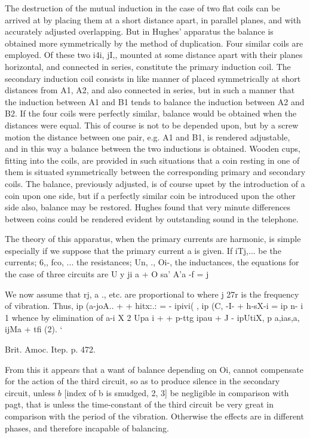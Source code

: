 The destruction of the mutual induction in the case of two flat coils can be
arrived at by placing them at a short distance apart,
in parallel planes, and with accurately adjusted overlapping. But
in Hughes’ apparatus the
balance is obtained more symmetrically by the method of duplication. Four
similar coils are employed.  Of these two i4i, jI,, mounted at some distance
apart with their planes horizontal, and connected in series, constitute the
primary induction coil. The secondary induction coil consists in like manner
of placed symmetrically at short distances from
A1, A2, and also connected in series, but in such a manner that the induction
between A1 and B1 tends to balance the induction between A2 and B2. If the
four coils were perfectly similar, balance would be obtained when the
distances were equal. This of course is not to be depended upon, but by a
screw motion the distance between one pair, e.g. A1 and B1, is rendered
adjustable, and in this way a balance between the two inductions is obtained.
Wooden cups, fitting into the coils, are provided in such situations that a
coin resting in one of them is situated symmetrically between the
corresponding primary and secondary coils. The balance, previously adjusted, is
of course upset by the introduction of a coin upon one side, but if a perfectly
similar coin be introduced upon the other side also, balance may be restored.
Hughes found that very minute differences between coins could be rendered
evident by outstanding sound in the telephone.

The theory of this apparatus, when the primary currents are harmonic, is simple
especially if we suppose that the primary current a is given. If iTj,... be
the currents; 6,, fco, ... the resistances; Un,  ., Oi-, the inductances, the
equations for the case of three circuits are U y ji a + O sa' A'a -f =  j

We now assume that rj, a ., etc. are proportional to where j 27r is the
frequency of vibration. Thus,
ip (a-joA.. + + hitx:.: = - ipivi(  ,
ip (C, -I- + h-sX-i =  ip n- i 1
whence by elimination of a-i
X 2 Upa i + + p-ttg
ipau + J - ipUtiX, p a,ias,a, ijMa + tfi (2).  ‘

Brit. Amoc. Itep. p. 472.

From this it appears that a want of balance depending on
Oi, cannot compensate for the
action of the third circuit, so as to produce silence in the secondary circuit,
unless \(b\)
[index of b is smudged, 2, 3]
be negligible in comparison with
pagt, that is unless the
time-constant of the third circuit be very great in comparison with the period
of the vibration. Otherwise the effects are in different phases, and therefore
incapable of balancing.

